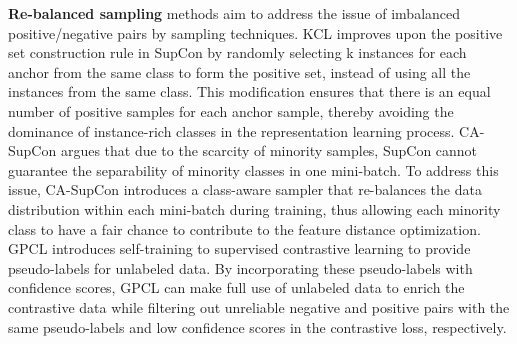 \textbf{Re-balanced sampling} methods aim to address the issue of imbalanced positive/negative pairs by sampling techniques. 
KCL \cite{kang2021exploring} improves upon the positive set construction rule in SupCon by randomly selecting k instances for each anchor from the same class to form the positive set, instead of using all the instances from the same class. This modification ensures that there is an equal number of positive samples for each anchor sample, thereby avoiding the dominance of instance-rich classes in the representation learning process.
CA-SupCon \cite{zhang2022class} argues that due to the scarcity of minority samples, SupCon cannot guarantee the separability of minority classes in one mini-batch. To address this issue, CA-SupCon introduces a class-aware sampler that re-balances the data distribution within each mini-batch during training, thus allowing each minority class to have a fair chance to contribute to the feature distance optimization.
GPCL \cite{jiang2021guided} introduces self-training to supervised contrastive learning to provide pseudo-labels for unlabeled data. By incorporating these pseudo-labels with confidence scores, GPCL can make full use of unlabeled data to enrich the contrastive data while filtering out unreliable negative and positive pairs with the same pseudo-labels and low confidence scores in the contrastive loss, respectively.


